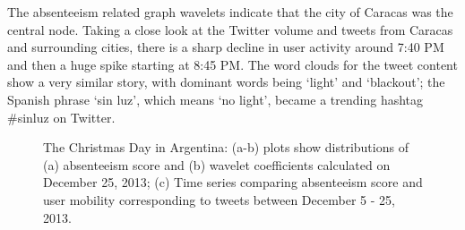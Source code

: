 The absenteeism related graph wavelets indicate that the city of Caracas was the central node. Taking a close look at the Twitter volume and tweets from Caracas and surrounding cities, there is a sharp decline in user activity around 7:40 PM and then a huge spike starting at 8:45 PM. The word clouds for the tweet content show a very similar story, with dominant words being `light' and `blackout'; the Spanish phrase `sin luz', which means `no light', became a trending hashtag \#sinluz on Twitter.



\begin{figure}[h]
	\centering
	\caption{The Christmas Day in Argentina: (a-b) plots show distributions of (a) absenteeism score and (b) wavelet coefficients calculated on December 25, 2013; (c) Time series comparing absenteeism score and user mobility corresponding to tweets between December 5 - 25, 2013.}
\label{fig:case3_wavelet}
\end{figure}


